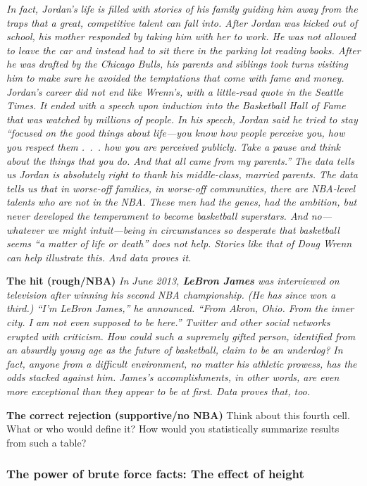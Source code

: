 \documentclass[]{book}
\theoremstyle{definition}
\theoremstyle{definition}
\theoremstyle{definition}
\theoremstyle{remark}
\begin{document}
\emph{In fact, Jordan's life is filled with stories of his family
guiding him away from the traps that a great, competitive talent can
fall into. After Jordan was kicked out of school, his mother responded
by taking him with her to work. He was not allowed to leave the car and
instead had to sit there in the parking lot reading books. After he was
drafted by the Chicago Bulls, his parents and siblings took turns
visiting him to make sure he avoided the temptations that come with fame
and money. Jordan's career did not end like Wrenn's, with a little-read
quote in the Seattle Times. It ended with a speech upon induction into
the Basketball Hall of Fame that was watched by millions of people. In
his speech, Jordan said he tried to stay ``focused on the good things
about life---you know how people perceive you, how you respect them
.~.~. how you are perceived publicly. Take a pause and think about the
things that you do. And that all came from my parents.'' The data tells
us Jordan is absolutely right to thank his middle-class, married
parents. The data tells us that in worse-off families, in worse-off
communities, there are NBA-level talents who are not in the NBA. These
men had the genes, had the ambition, but never developed the temperament
to become basketball superstars. And no---whatever we might
intuit---being in circumstances so desperate that basketball seems ``a
matter of life or death'' does not help. Stories like that of Doug Wrenn
can help illustrate this. And data proves it.}

\textbf{The hit (rough/NBA)} \emph{In June 2013, \textbf{LeBron James}
was interviewed on television after winning his second NBA championship.
(He has since won a third.) ``I'm LeBron James,'' he announced. ``From
Akron, Ohio. From the inner city. I am not even supposed to be here.''
Twitter and other social networks erupted with criticism. How could such
a supremely gifted person, identified from an absurdly young age as the
future of basketball, claim to be an underdog? In fact, anyone from a
difficult environment, no matter his athletic prowess, has the odds
stacked against him. James's accomplishments, in other words, are even
more exceptional than they appear to be at first. Data proves that,
too.}

\textbf{The correct rejection (supportive/no NBA)} Think about this
fourth cell. What or who would define it? How would you statistically
summarize results from such a table?

\subsubsection{The power of brute force facts: The effect of
height}\label{the-power-of-brute-force-facts-the-effect-of-height}
\end{document}
